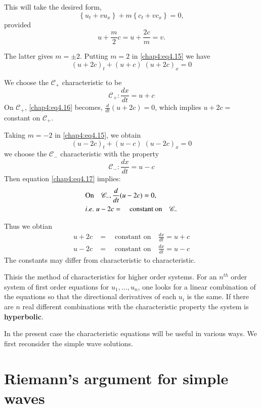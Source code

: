 This will take the desired form,
$$
\left\{u_t+vu_x\right\}+m\left\{c_t+vc_x\right\}=0,
$$
provided
$$
u+\frac{m}{2}c=u+\frac{2c}{m}=v.
$$

The latter gives $m=\pm 2$. Putting $m=2$ in \eqref{chap4:eq4.15} we have 
\begin{equation}
(u+2c)_t+(u+c)\;(u+2c)_x=0\tag{4.16}\label{chap4:eq4.16}
\end{equation}

We choose the $\mathscr{C}_+$ characteristic to be 
$$
\mathscr{C}_+:\frac{dx}{dt}=u+c
$$
On $\mathscr{C}_+$, \eqref{chap4:eq4.16} becomes, $\frac{d}{dt}(u+2c)=0$, which implies $u+2c=$ constant on $\mathscr{C}_+$.

Taking $m=-2$ in \eqref{chap4:eq4.15}, we obtain
\begin{equation}
(u-2c)_t+(u-c)\;(u-2c)_x=0\tag{4.17}\label{chap4:eq4.17}
\end{equation}
we choose the $\mathscr{C}_-$ characteristic with the property
$$
\mathscr{C}_-:\frac{dx}{dt}=u-c
$$
Then equation \eqref{chap4:eq4.17} implies: 
\begin{align*}
&\text{On}\quad \mathscr{C}_-,\frac{d}{dt}(u-2c)=0,\\
&{i.e.}\kern.3em u-2c=\quad\text{constant on}\quad \mathscr{C}_-
\end{align*}

Thus we obtian
\begin{align*}
u+2c &= \quad\text{constant on}\quad \frac{dx}{dt}=u+c\\
u-2c &=\quad\text{constant on}\quad \frac{dx}{dt}=u-c
\end{align*}
The constants may differ from characteristic to characteristic.

This\pageoriginale is the method of characteristics for higher order systems. For an $n^{th}$ order system of first order equations for $u_1,\ldots,u_n$, one looks for a linear combination of the equations so that the directional derivatives of each $u_i$ is the same. If there are $n$ real different combinations with the characteristic property the system is {\bf hyperbolic}.

In the present case the characteristic equations will be useful in various ways. We first reconsider the simple wave solutions.

\section{Riemann's argument for simple waves}\label{chap4:sec4.4}

